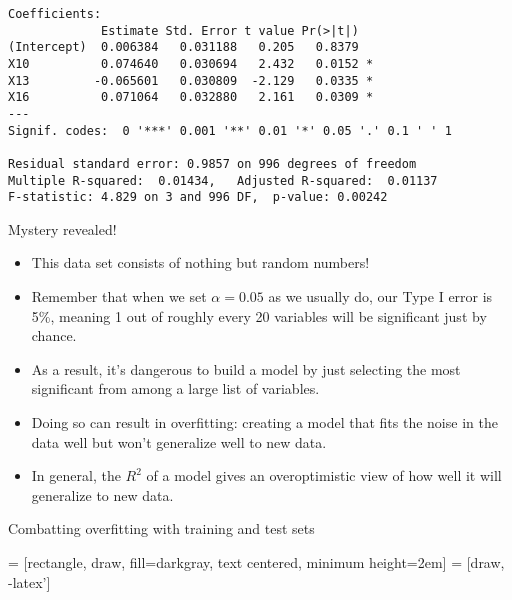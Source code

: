 \documentclass{beamer}\usepackage[]{graphicx}\usepackage[]{color}
\makeatletter
\newenvironment{kframe}{%
 \def\at@end@of@kframe{}%
 \ifinner\ifhmode%
  \def\at@end@of@kframe{\end{minipage}}%
  \begin{minipage}{\columnwidth}%
 \fi\fi%
 \def\FrameCommand##1{\hskip\@totalleftmargin \hskip-\fboxsep
 \colorbox{shadecolor}{##1}\hskip-\fboxsep
     \hskip-\linewidth \hskip-\@totalleftmargin \hskip\columnwidth}%
 \MakeFramed {\advance\hsize-\width
   \@totalleftmargin\z@ \linewidth\hsize
   \@setminipage}}%
 {\par\unskip\endMakeFramed%
 \at@end@of@kframe}
\newenvironment{knitrout}{}{} %
\makeatother
\begin{document}
\begin{darkframes}
\begin{frame}[fragile]
\begin{knitrout}
\begin{kframe}
\begin{verbatim}
Coefficients:
             Estimate Std. Error t value Pr(>|t|)  
(Intercept)  0.006384   0.031188   0.205   0.8379  
X10          0.074640   0.030694   2.432   0.0152 *
X13         -0.065601   0.030809  -2.129   0.0335 *
X16          0.071064   0.032880   2.161   0.0309 *
---
Signif. codes:  0 '***' 0.001 '**' 0.01 '*' 0.05 '.' 0.1 ' ' 1

Residual standard error: 0.9857 on 996 degrees of freedom
Multiple R-squared:  0.01434,	Adjusted R-squared:  0.01137 
F-statistic: 4.829 on 3 and 996 DF,  p-value: 0.00242
\end{verbatim}
\end{kframe}
\end{knitrout}
    \end{frame}

    \begin{frame}{Mystery revealed!}
      \begin{itemize}[<+->]
        \item This data set consists of nothing but random numbers!
        \item Remember that when we set $\alpha=0.05$ as we usually do, our Type I error is 5\%, meaning 1 out of roughly every 20 variables will be significant just by chance.
        \item As a result, it's dangerous to build a model by just selecting the most significant from among a large list of variables.
        \item Doing so can result in \alert{overfitting}: creating a model that fits the noise in the data well but won't generalize well to new data.
        \item In general, the $R^2$ of a model gives an overoptimistic view of how well it will generalize to new data.
      \end{itemize}
    \end{frame}

    \begin{frame}{Combatting overfitting with training and test sets}
      \begin{center}
         = [rectangle, draw, fill=darkgray,
          text centered, minimum height=2em]
         = [draw, -latex']

      \end{center}


\end{frame}
\end{darkframes}
\end{document}
